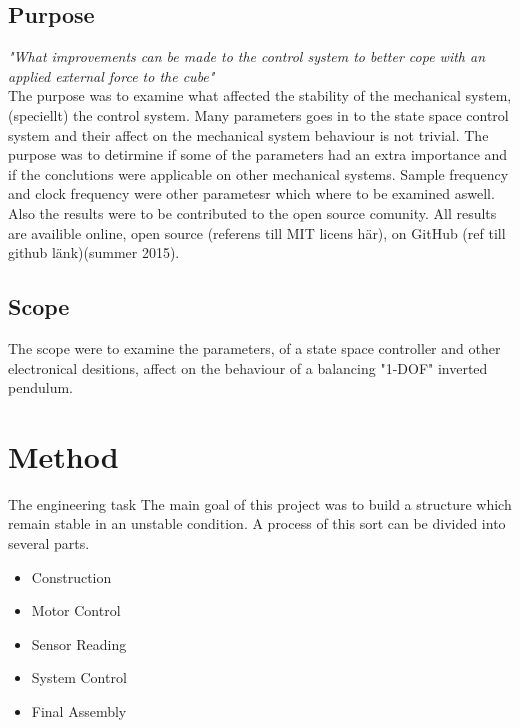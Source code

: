 \documentclass[a4paper,11pt]{kth-mag}
\begin{document}
\section{Purpose}

\emph{"What improvements can be made to the control system to better cope with an applied external force to the cube" } \\

\noindent{}The purpose was to examine what affected the stability of the mechanical system, (speciellt) the control system. Many parameters goes in to the state space control system and their affect on the mechanical system behaviour is not trivial. The purpose was to detirmine if some of the parameters had an extra importance and if the conclutions were applicable on other mechanical systems. Sample frequency and clock frequency were other parametesr which where to be examined aswell. Also the results were to be contributed to the open source comunity. All results are availible online, open source (referens till MIT licens här), on GitHub (ref till github länk)(summer 2015).\\  


\section{Scope}
The scope were to examine the parameters, of a state space controller and other electronical desitions, affect on the behaviour of a balancing "1-DOF" inverted pendulum.


\chapter{Method}

The engineering task The main goal of this project was to build a structure which remain stable in an unstable condition. A process of this sort can be divided into several parts. 
\begin{itemize}
\item Construction
\item Motor Control
\item Sensor Reading
\item System Control
\item Final Assembly
\end{itemize}
\end{document}
